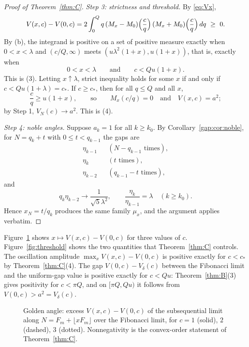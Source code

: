 \documentclass[11pt]{amsart}
\theoremstyle{remark}
\newcommand{\Vd}{V_\delta}
\begin{document}
\begin{proof}[Proof of Theorem~\ref{thm:C}]
\emph{Step 3: strictness and threshold.} By \eqref{eq:Vx},
\begin{equation}\label{eq:Vdiff}
V(x,c)-V(0,c)=2\int_0^Q q\,(M_x-M_0)\Bigl(\frac cq\Bigr)\,(M_x+M_0)\Bigl(\frac cq\Bigr)\,dq\ \ge\ 0 .
\end{equation}
By (b), the integrand is positive on a set of positive measure exactly when $0<x<\lambda$
and $(c/Q,\infty)$ meets $(u\lambda^2(1+x),u(1+x))$, that is, exactly when
\[
0<x<\lambda\qquad\text{and}\qquad c<Qu(1+x).
\]
This is (3). Letting $x\uparrow\lambda$, strict inequality holds for some $x$ if and only
if $c<Qu(1+\lambda)=c_*$. If $c\ge c_*$, then for all $q\le Q$ and all $x$,
\[
\frac cq\ge u(1+x),\qquad\text{so}\qquad M_x(c/q)=0\quad\text{and}\quad V(x,c)=a^2 ;
\]
by Step 1, $V_N(c)\to a^2$. This is (4).

\emph{Step 4: noble angles.} Suppose $a_k=1$ for all $k\ge k_0$. By
Corollary~\ref{gap:cor:noble}, for $N=q_k+t$ with $0\le t<q_{k-1}$ the gaps are
\begin{align*}
\eta_{k-1}&&(N-q_{k-1}\text{ times}),\\
\eta_{k}&&(t\text{ times}),\\
\eta_{k-2}&&(q_{k-1}-t\text{ times}),
\end{align*}
and
\[
q_k\eta_{k-2}\to\frac1{\sqrt5\lambda^2},\qquad \frac{\eta_k}{\eta_{k-1}}=\lambda\quad(k\ge k_0).
\]
Hence $x_N=t/q_k$ produces the same family $\mu_x$, and the argument applies verbatim.
\end{proof}

Figure~\ref{fig:phase} shows $x\mapsto V(x,c)-V(0,c)$ for three values of $c$.
Figure~\ref{fig:threshold} shows the two quantities that Theorem~\ref{thm:C} controls. The
oscillation amplitude $\max_xV(x,c)-V(0,c)$ is positive exactly for $c<c_*$ by
Theorem~\ref{thm:C}(4). The gap $V(0,c)-\Vd(c)$ between the Fibonacci limit and the
uniform-gap value is positive exactly for $c<Qu$: Theorem~\ref{thm:B}(3) gives positivity
for $c<\pi Q$, and on $[\pi Q,Qu)$ it follows from $V(0,c)>a^2=\Vd(c)$.

\begin{figure}[t]
\centering
\begin{tikzpicture}[scale=0.85]

\end{tikzpicture}
\caption{Golden angle: excess $V(x,c)-V(0,c)$ of the subsequential limit along
$N=F_m+\lfloor xF_m\rfloor$ over the Fibonacci limit, for $c=1$ (solid), $2$ (dashed), $3$
(dotted). Nonnegativity is the convex-order statement of Theorem~\ref{thm:C}.}
\label{fig:phase}
\end{figure}
\end{document}
